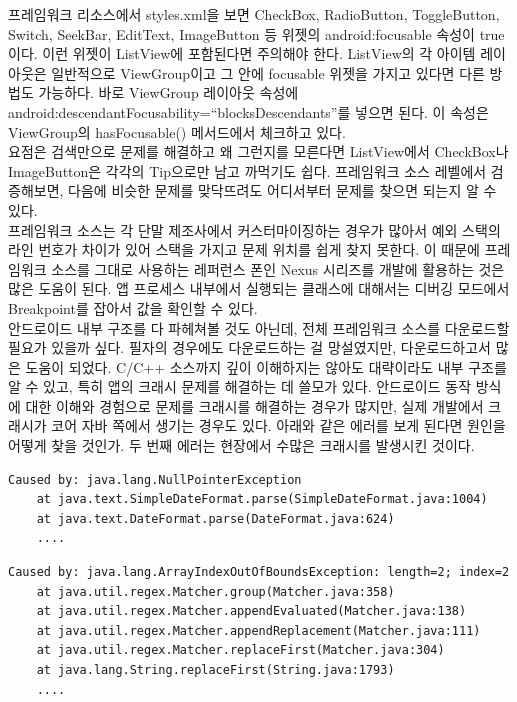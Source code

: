 프레임워크 리소스에서 styles.xml을 보면 CheckBox, RadioButton, ToggleButton, Switch, SeekBar, EditText, ImageButton 등 위젯의 android:focusable 속성이 true이다. 이런 위젯이 ListView에 포함된다면 주의해야 한다.
ListView의 각 아이템 레이아웃은 일반적으로 ViewGroup이고 그 안에 focusable 위젯을 가지고 있다면 다른 방법도 가능하다. 바로 ViewGroup 레이아웃 속성에 android:descendantFocusability=``blocksDescendants''를 넣으면 된다. 이 속성은 ViewGroup의 hasFocusable() 메서드에서 체크하고 있다.\\

요점은 검색만으로 문제를 해결하고 왜 그런지를 모른다면 ListView에서 CheckBox나 ImageButton은 각각의 Tip으로만 남고 까먹기도 쉽다. 프레임워크 소스 레벨에서 검증해보면, 다음에 비슷한 문제를 맞닥뜨려도 어디서부터 문제를 찾으면 되는지 알 수 있다.\\

프레임워크 소스는 각 단말 제조사에서 커스터마이징하는 경우가 많아서 예외 스택의 라인 번호가 차이가 있어 스택을 가지고 문제 위치를 쉽게 찾지 못한다. 이 때문에 프레임워크 소스를 그대로 사용하는 레퍼런스 폰인 Nexus 시리즈를 개발에 활용하는 것은 많은 도움이 된다. 앱 프로세스 내부에서 실행되는 클래스에 대해서는 디버깅 모드에서 Breakpoint를 잡아서 값을 확인할 수 있다.\\

안드로이드 내부 구조를 다 파헤쳐볼 것도 아닌데, 전체 프레임워크 소스를 다운로드할 필요가 있을까 싶다. 필자의 경우에도 다운로드하는 걸 망설였지만, 다운로드하고서 많은 도움이 되었다. C/C++ 소스까지 깊이 이해하지는 않아도 대략이라도 내부 구조를 알 수 있고, 특히 앱의 크래시 문제를 해결하는 데 쓸모가 있다. 
안드로이드 동작 방식에 대한 이해와 경험으로 문제를 크래시를 해결하는 경우가 많지만, 실제 개발에서 크래시가 코어 자바 쪽에서 생기는 경우도 있다.
아래와 같은 에러를 보게 된다면 원인을 어떻게 찾을 것인가. 두 번째 에러는 현장에서 수많은 크래시를 발생시킨 것이다.
\begin{lstlisting}[frame=single]
Caused by: java.lang.NullPointerException
	at java.text.SimpleDateFormat.parse(SimpleDateFormat.java:1004)
	at java.text.DateFormat.parse(DateFormat.java:624)
	....
\end{lstlisting}

\begin{lstlisting}[frame=single]
Caused by: java.lang.ArrayIndexOutOfBoundsException: length=2; index=2
	at java.util.regex.Matcher.group(Matcher.java:358)
	at java.util.regex.Matcher.appendEvaluated(Matcher.java:138)
	at java.util.regex.Matcher.appendReplacement(Matcher.java:111)
	at java.util.regex.Matcher.replaceFirst(Matcher.java:304)
	at java.lang.String.replaceFirst(String.java:1793)
	....
\end{lstlisting}

